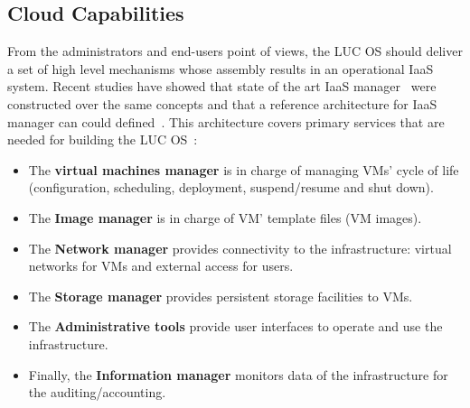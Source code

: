 
\subsection{Cloud Capabilities}

From the administrators and end-users point of views, the LUC OS should deliver a set of
high level mechanisms whose assembly results in an operational IaaS system. Recent studies
have showed that state of the art IaaS manager~\cite{peng:2009} were constructed over the
same concepts and that a reference architecture for IaaS manager can could
defined~\cite{moreno2012iaas}.
%
This architecture covers primary services that are needed for building
the LUC OS~:
\begin{itemize}
\item The \textbf{virtual machines manager} is in charge of managing VMs' cycle of life
(configuration, scheduling, deployment, suspend/resume and shut down).
\item The \textbf{Image
  manager} is in charge of VM' template files (\aka VM images).
\item The \textbf{Network
  manager} provides connectivity to the infrastructure: virtual networks for VMs and
external access for users.
\item The \textbf{Storage manager} provides persistent storage
facilities to VMs.
\item The \textbf{Administrative tools} provide user interfaces to operate
and use the infrastructure.
\item Finally, the \textbf{Information manager} monitors data of the
infrastructure for the auditing/accounting.
\end{itemize}

